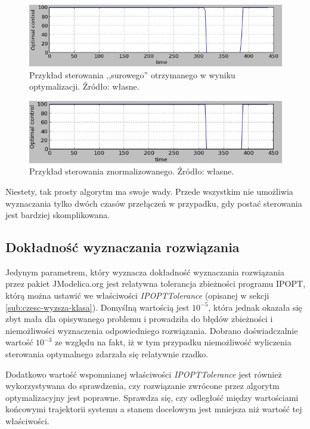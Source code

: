 \begin{figure}[ht]
    \centering
    \includegraphics[width=\textwidth]{Grafika/ctrl_10_10_10-20_20_20-raw}
    \caption{Przykład sterowania ,,surowego'' otrzymanego w wyniku optymalizacji. Źródło: własne.}
    \label{fig:ctrl-raw-example}
\end{figure}

\begin{figure}[ht]
    \centering
    \includegraphics{Grafika/ctrl_10_10_10-20_20_20-normalised}
    \caption{Przykład sterowania znormalizowanego. Źródło: własne.}
    \label{fig:ctrl-normalised-example}
\end{figure}

Niestety, tak prosty algorytm ma swoje wady. Przede wszystkim nie umożliwia wyznaczania tylko dwóch czasów przełączeń w przypadku, gdy postać sterowania jest bardziej skomplikowana.


\subsection{Dokładność wyznaczania rozwiązania}
\label{sub:opt-dokladnosc}

Jedynym parametrem, który wyznacza dokładność wyznaczania rozwiązania przez pakiet JModelica.org jest relatywna tolerancja zbieżności programu IPOPT, którą można ustawić we właściwości \emph{IPOPTTolerance} (opisanej w sekcji \ref{sub:czesc-wyzsza-klasa}). Domyślną wartością jest $10^{-5}$, która jednak okazała się zbyt mała dla opisywanego problemu i prowadziła do błędów zbieżności i niemożliwości wyznaczenia odpowiedniego rozwiązania. Dobrano doświadczalnie wartość $10^{-3}$ ze względu na fakt, iż w tym przypadku niemożliwość wyliczenia sterowania optymalnego zdarzała się relatywnie rzadko.

Dodatkowo wartość wspomnianej właściwości \emph{IPOPTTolerance} jest również wykorzystywana do sprawdzenia, czy rozwiązanie zwrócone przez algorytm optymalizacyjny jest poprawne. Sprawdza się, czy odległość między wartościami końcowymi trajektorii systemu a stanem docelowym jest mniejsza niż wartość tej właściwości.
